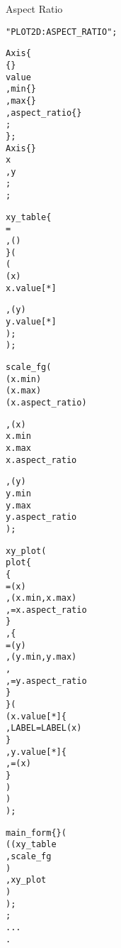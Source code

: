 
\label{des:plot2dAspectRatio}
\begin{center}
  {\LARGE Aspect Ratio \\[2ex]}
\end{center}

\begin{boxedminipage}[t]{\linewidth}
\begin{alltt}
\DESCRIPTION "PLOT2D: ASPECT_RATIO";

\DATAPOOL
  \STRUCT Axis \{
    \REAL \{\EDITABLE\}
      value
    , min \{\SCALAR\}
    , max \{\SCALAR\}
    , aspect_ratio \{\SCALAR\}
    ;
  \};
  Axis \{\SCALAR\}
    x
  , y
  ;
\END \DATAPOOL;

\UIMANAGER
  \TABLE xy_table \{
    \ORIENTATION=\VERTICAL
  , \HORIZONTAL()
  \} (
    \TABLE (
      \LABEL(x)
      x.value[*]

    , \LABEL(y)
      y.value[*]
    );
  );

  \FIELDGROUP scale_fg (
    \VOID
    \LABEL(x.min)
    \LABEL(x.max)
    \LABEL(x.aspect_ratio)

  , \LABEL(x)
    x.min
    x.max
    x.aspect_ratio

  , \LABEL(y)
    y.min
    y.max
    y.aspect_ratio
  );
\end{alltt}
\end{boxedminipage}

\begin{boxedminipage}[t]{\linewidth}
\begin{alltt}
  \PLOTTWOD xy_plot (
    plot \{
      \XAXIS \{
        \LABEL=\LABEL(x)
      , \SCALE(x.min, x.max)
      , \ASPECTRATIO=x.aspect_ratio
      \}
    , \YAXISONE \{
        \LABEL=\LABEL(y)
      , \SCALE(y.min, y.max)
      , \ASPECTRATIOREFAXIS
      , \ASPECTRATIO=y.aspect_ratio
      \}
    \} (
      ( x.value[*] \{
          \XAXIS
        , LABEL=LABEL(x)
        \}
      , y.value[*] \{
          \YAXISONE
        , \LABEL=\LABEL(x)
        \}
      )
    )
  );

  \FORM main_form \{\MAIN\} (
    ( ( xy_table
      , scale_fg
      )
    , xy_plot
    )
  );
\END \UIMANAGER;
...
\END.
\end{alltt}
\end{boxedminipage}

%
\newpage

